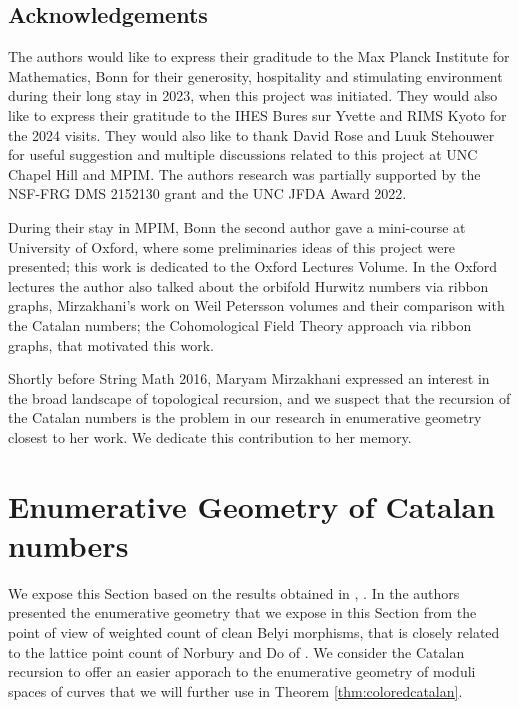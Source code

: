 \documentclass{amsart}
\theoremstyle{definition}
\begin{document}
\subsection*{Acknowledgements} The authors would like to express their graditude to the Max Planck Institute for Mathematics, Bonn for their generosity, hospitality and stimulating environment during their long stay in 2023, when this project was initiated. They would also like to express their gratitude to the IHES Bures sur Yvette and RIMS Kyoto for the 2024 visits.  They would also like to thank  David Rose and  Luuk Stehouwer for useful suggestion and multiple discussions related to this project at UNC Chapel Hill and MPIM. The authors research was partially supported by the NSF-FRG DMS 2152130 grant and the UNC JFDA Award 2022. 


 During their stay in MPIM, Bonn the second author gave a mini-course at University of Oxford, where some preliminaries ideas of this project were presented; this work is dedicated to the Oxford Lectures Volume. In the Oxford lectures the author also talked about the orbifold Hurwitz numbers via ribbon graphs,  Mirzakhani's work on Weil Petersson volumes and their comparison with the Catalan numbers; the Cohomological Field Theory approach via ribbon graphs, that motivated this work.



 
 Shortly before String Math 2016, Maryam Mirzakhani expressed an interest in the broad landscape of topological recursion, and we suspect that the recursion of the Catalan numbers is the problem in our research in enumerative geometry closest to her work. We dedicate this contribution to her memory.



\section{Enumerative Geometry of Catalan numbers}\label{Catalan}
We expose this Section based on the results obtained in \cite{DMSS}, \cite{DM_invitation}. In \cite{DMSS} the authors presented the enumerative geometry that we expose in this Section from the point of view of weighted count of clean Belyi morphisms, that is closely related to the lattice point count of Norbury and Do of \cite{Norbury}. We consider the Catalan recursion to offer an easier apporach to the enumerative geometry of moduli spaces of curves that we will further use in Theorem \ref{thm:coloredcatalan}.
\end{document}

